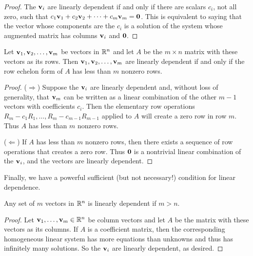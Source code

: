 \documentclass[../m073main.tex]{subfiles}
\begin{document}
\begin{proof}
	The $\mathbf{v}_i$ are linearly dependent if and only if there are scalars $c_i$, not all zero, such that $c_1 \mathbf{v}_1 + c_2 \mathbf{v}_2 + \cdots + c_m \mathbf{v}_m = \mathbf{0}$.
	This is equivalent to saying that the vector whose components are the $c_i$ is a solution of the system whose augmented matrix has columns $\mathbf{v}_i$ and $\mathbf{0}$.
\end{proof}

\begin{theorem}
	Let $\mathbf{v}_1, \mathbf{v}_2, \ldots, \mathbf{v}_m$ be vectors in $\mathbb{R}^n$ and let $A$ be the $m \times n$ matrix with these vectors as its rows.
	Then $\mathbf{v}_1, \mathbf{v}_2, \ldots, \mathbf{v}_m$ are linearly dependent if and only if the row echelon form of $A$ has less than $m$ nonzero rows.
\end{theorem}

\begin{proof}
	($\Rightarrow$) Suppose the $\mathbf{v}_i$ are linearly dependent and, without loss of generality, that $\mathbf{v}_m$ can be written as a linear combination of the other $m-1$ vectors with coefficients $c_i$.
	Then the elementary row operations $R_m - c_1 R_1, \ldots, R_m - c_{m-1} R_{m-1}$ applied to $A$ will create a zero row in row $m$.
	Thus $A$ has less than $m$ nonzero rows.

	($\Leftarrow$) If $A$ has less than $m$ nonzero rows, then there exists a sequence of row operations that creates a zero row.
	Thus $\mathbf{0}$ is a nontrivial linear combination of the $\mathbf{v}_i$, and the vectors are linearly dependent.
\end{proof}

Finally, we have a powerful sufficient (but not necessary!) condition for linear dependence.

\begin{theorem}
	Any set of $m$ vectors in $\mathbb{R}^n$ is linearly dependent if $m > n$.
\end{theorem}

\begin{proof}
	Let $\mathbf{v}_1, \ldots, \mathbf{v}_m \in \mathbb{R}^n$ be column vectors and let $A$ be the matrix with these vectors as its columns.
	If $A$ is a coefficient matrix, then the corresponding homogeneous linear system has more equations than unknowns and thus has infinitely many solutions.
	So the $\mathbf{v}_i$ are linearly dependent, as desired.
\end{proof}
\end{document}
